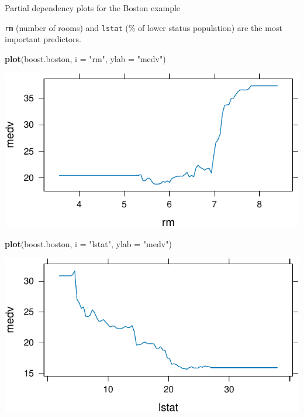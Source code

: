 \documentclass[
  10pt,
  ignorenonframetext,
]{beamer}
\newenvironment{Shaded}{\begin{snugshade}}{\end{snugshade}}
\newcommand{\AttributeTok}[1]{\textcolor[rgb]{0.13,0.29,0.53}{#1}}
\newcommand{\FunctionTok}[1]{\textcolor[rgb]{0.13,0.29,0.53}{\textbf{#1}}}
\newcommand{\NormalTok}[1]{#1}
\newcommand{\StringTok}[1]{\textcolor[rgb]{0.31,0.60,0.02}{#1}}
\begin{document}
\begin{frame}[fragile]
\begin{block}{Partial dependency plots for the Boston example}
\protect\hypertarget{partial-dependency-plots-for-the-boston-example}{}
\(~\)

\texttt{rm} (number of rooms) and \texttt{lstat} (\% of lower status
population) are the most important predictors.

\vspace{2mm}

\scriptsize

\begin{Shaded}
\begin{Highlighting}[]
\FunctionTok{plot}\NormalTok{(boost.boston, }\AttributeTok{i =} \StringTok{"rm"}\NormalTok{, }\AttributeTok{ylab =} \StringTok{"medv"}\NormalTok{)}
\end{Highlighting}
\end{Shaded}

\begin{center}\includegraphics[width=0.4\linewidth]{9TreeBost_files/figure-beamer/boston7-1} \end{center}

\begin{Shaded}
\begin{Highlighting}[]
\FunctionTok{plot}\NormalTok{(boost.boston, }\AttributeTok{i =} \StringTok{"lstat"}\NormalTok{, }\AttributeTok{ylab =} \StringTok{"medv"}\NormalTok{)}
\end{Highlighting}
\end{Shaded}

\begin{center}\includegraphics[width=0.4\linewidth]{9TreeBost_files/figure-beamer/boston7-2} \end{center}
\end{block}
\end{frame}
\end{document}
